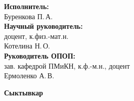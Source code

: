 \begin{titlepage}
	\vfill
	
	\noindent
	\begin{minipage}{0.55\textwidth}
		
		{\bfseries\fontsize{12pt}{14pt}\selectfont Исполнитель:}\\
		{\fontsize{12pt}{14pt}\selectfont
			Буренкова П.\,А. \underline{\hspace{5cm}}}\\
		
		{\bfseries\fontsize{12pt}{14pt}\selectfont Научный руководитель:}\\
		{\fontsize{12pt}{14pt}\selectfont
			доцент, к.физ.-мат.н.}\\
		{\fontsize{12pt}{14pt}\selectfont
			Котелина Н.\,О. \underline{\hspace{4cm}}}\\
		
		{\bfseries\fontsize{12pt}{14pt}\selectfont Руководитель ОПОП:}\\
		{\fontsize{12pt}{14pt}\selectfont
			зав. кафедрой ПМиКН, к.ф.-м.н., доцент}\\
		{\fontsize{12pt}{14pt}\selectfont
			Ермоленко А.\,В. \underline{\hspace{4cm}}}
		
	\end{minipage}
	
	\vfill
	
	\begin{center}
		{\bfseries\fontsize{12pt}{14pt}\selectfont Сыктывкар}\\
		{\bfseries\fontsize{12pt}{14pt}\selectfont \the\year}
	\end{center}
	
	\restoregeometry
	
\end{titlepage}